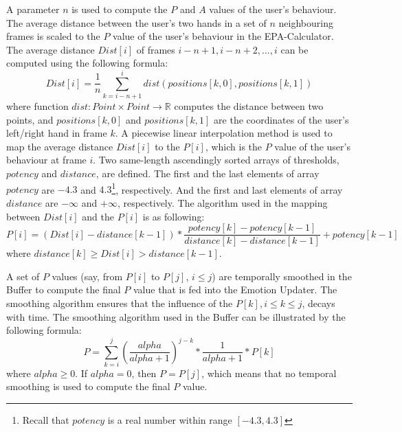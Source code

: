 A parameter $n$ is used to compute the $P$ and $A$ values of the user's behaviour. The average distance between the user's two hands in a set of $n$ neighbouring frames is scaled to the $P$ value of the user's behaviour in the EPA-Calculator. The average distance $Dist[i]$ of frames $i-n+1, i-n+2, ... , i$ can be computed using the following formula:
\begin{equation}
Dist[i]=\dfrac{1}{n} \sum_{k=i-n+1}^{i}dist(positions[k,0],positions[k,1])
\end{equation}
where function $dist: Point \times Point \to \mathbb{R}$ computes the distance between two points, and $positions[k,0]$ and $positions[k,1]$ are the coordinates of the user's left/right hand in frame $k$. A piecewise linear interpolation method is used to map the average distance $Dist[i]$ to the $P[i]$, which is the $P$ value of the user's behaviour at frame $i$. Two same-length ascendingly sorted arrays of thresholds, $potency$ and $distance$, are defined. The first and the last elements of array $potency$ are $-4.3$ and $4.3$\footnote{Recall that $potency$ is a real number within range $[-4.3, 4.3]$}, respectively. And the first and last elements of array $distance$ are $-\infty$ and $+\infty$, respectively. The algorithm used in the mapping between $Dist[i]$ and the $P[i]$ is as following:
\begin{equation}
P[i]=(Dist[i]-distance[k-1]) * \dfrac{potency[k]-potency[k-1]}{distance[k]-distance[k-1]} + potency[k-1]
\end{equation}
where $distance[k] \geq Dist[i]>distance[k-1]$.

A set of $P$ values (say, from $P[i]$ to $P[j]$, $i \leq j$) are temporally smoothed in the Buffer to compute the final $P$ value that is fed into the Emotion Updater. The smoothing algorithm ensures that the influence of the $P[k], i \leq k \leq j$, decays with time. The smoothing algorithm used in the Buffer can be illustrated by the following formula:
\begin{equation}
P=\sum_{k=i}^{j}(\dfrac{alpha}{alpha+1})^{j-k}*\dfrac{1}{alpha+1}*P[k]
\end{equation}
where $alpha \geq 0$.
If $alpha=0$, then $P=P[j]$, which means that no temporal smoothing is used to compute the final $P$ value.

